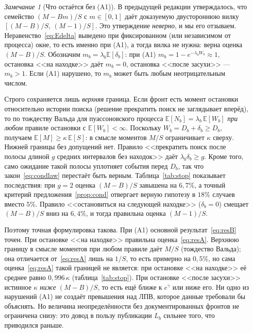 \documentclass[11pt,a4paper]{article}
\theoremstyle{plain}
\theoremstyle{remark}
\newtheorem{remark}{Замечание}
\newcommand{\eg}{e^{\gamma}}
\begin{document}
\begin{remark}[Что остаётся без (A1)]\label{rem:bracket}
В предыдущей редакции утверждалось, что семейство $(M-Bm)/S$ с $m\in[0,1]$ даёт
доказуемую двустороннюю вилку $[(M-B)/S,\ (M-1)/S]$. Это утверждение
\emph{неверно}, и мы его отзываем. Неравенство~\eqref{eq:Edelta} выведено при
фиксированном (или независимом от процесса) окне, то есть именно при (A1), а
тогда вилка не нужна: верна оценка $(M-B)/S$. Обозначим
$m_b=\lambda_b\mathbb E[\delta_b]$: при (A1) $m_b=1-e^{-\lambda_bW_b}\approx1$,
остановка <<на находке>> даёт $m_b=0$, остановка <<после засухи>> ---
$m_b>1$. Если (A1) нарушено, то $m_b$ может быть любым неотрицательным числом.

Строго сохраняется лишь \emph{верхняя} граница. Если фронт есть момент
остановки относительно истории поиска (решение прекратить поиск не заглядывает
вперёд), то по тождеству Вальда для пуассоновского процесса
$\mathbb E[N_b]=\lambda_b\,\mathbb E[W_b]$ \emph{при любом} правиле остановки с
$\mathbb E[W_b]<\infty$. Поскольку $W_b=D_b+\delta_b\ge D_b$, получаем
$\mathbb E[M]\ge\kappa\,\mathbb E[S]$: в смысле моментов $M/S$ ограничивает $\kappa$
сверху. Нижней границы без допущений нет. Правило <<прекратить поиск после полосы
длиной $g$ средних интервалов без находок>> даёт $\lambda_b\delta_b\ge g$. Кроме
того, само ожидание такой полосы уплотняет события перед $D_b$, так что
закон~\eqref{eq:condlaw} перестаёт быть верным. Таблица~\ref{tab:stop} показывает
последствия: при $g=2$ оценка $(M-B)/S$ завышена на $6{,}7\%$, а точный критерий
предложения~\ref{prop:cond} отвергает верную гипотезу в $18\%$ случаев вместо
$5\%$. Правило <<остановиться на следующей находке>> ($\delta_b=0$) смещает
$(M-B)/S$ вниз на $6{,}4\%$, и тогда правильна оценка $(M-1)/S$.

Поэтому точная формулировка такова. При (A1) основной результат~\eqref{eq:resB}
точен. При остановке <<на находке>> правильна оценка~\eqref{eq:resA}. Верхнюю
границу в смысле моментов при любом правиле даёт $M/S$ (тождество Вальда); она
отличается от~\eqref{eq:resA} лишь на $1/S$, то есть примерно на $0{,}5\%$, но
сама оценка~\eqref{eq:resA} такой границей не является: при остановке <<на
находке>> её среднее равно $0{,}996\,\kappa$ (таблица~\ref{tab:stop}). При остановке
<<после засухи>> истинное $\kappa$ \emph{ниже} $(M-B)/S$, то есть ещё ближе к
$\eg$ или ниже его. Ни одно из нарушений (A1) не создаёт превышения над ЛПВ,
которое данные требовали бы объяснять. Но величина неопределённости без
документированных фронтов не ограничена снизу: это довод в пользу
публикации $L_b$ сильнее того, что приводился раньше.


\end{remark}
\end{document}
